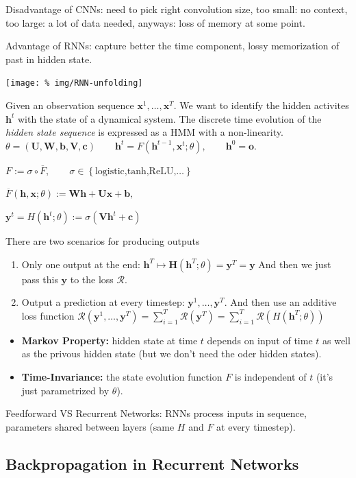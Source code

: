 \documentclass[a2paper,4pt]{extarticle}
\newcommand{\cR}{\mathcal{R}}
\newcommand{\set}[1]{\left\{ #1 \right\}}
\newcommand{\mat}[1]{\mathbf{#1}}
\renewcommand{\vec}[1]{\mathbf{#1}}
\newcommand{\vb}{\vec{b}}
\newcommand{\vc}{\vec{c}}
\newcommand{\vh}{\vec{h}}
\newcommand{\vo}{\vec{o}}
\newcommand{\vx}{\vec{x}}
\newcommand{\vy}{\vec{y}}
\newcommand{\MH}{\mat{H}}
\newcommand{\MU}{\mat{U}}
\newcommand{\MV}{\mat{V}}
\newcommand{\MW}{\mat{W}}
\begin{document}
\begin{landscape}
\begin{multicols*}{7}
Disadvantage of CNNs: need to pick right convolution size, too small: no
context, too large: a lot of data needed, anyways: loss of memory at some point.

Advantage of RNNs: capture better the time component, lossy memorization of
past in hidden state.

\begin{center}
  \texttt{[image: \%
img/RNN-unfolding]}
\end{center}

Given an observation sequence $\vx^1,\ldots,\vx^T$. We want to identify the
hidden activites $\vh^t$ with the state of a dynamical system. The discrete time
evolution of the \emph{hidden state sequence} is expressed as a HMM with a non-linearity.
$
\theta=(\MU,\MW,\vb,\MV,\vc)\qquad
\vh^t=F(\vh^{t-1},\vx^t;\theta),
\qquad
\vh^0=\vo.$

$
F:=\sigma\circ\overline{F},
\qquad
\sigma\in\set{\text{logistic,tanh,ReLU,\ldots}}
$

$
\overline{F}(\vh,\vx;\theta)
:=
\MW\vh+\MU\vx+\vb,
$

$
\vy^t=H(\vh^t;\theta):=\sigma(\MV\vh^t+\vc)
$

There are two scenarios for producing outputs
\begin{enumerate}
  \item Only one output at the end:
  $
  \vh^T\mapsto\MH(\vh^T;\theta)=\vy^T=\vy
  $
  And then we just pass this $\vy$ to the loss $\cR$.
  \item Output a prediction at every timestep: $\vy^1,\ldots,\vy^T$. And then
  use an additive loss function
  $
  \cR(\vy^1,\ldots,\vy^T)=
  \sum_{i=1}^T\cR(\vy^T)=
  \sum_{i=1}^T\cR(H(\vh^T;\theta))
  $
\end{enumerate}
\begin{itemize}
  \item \textbf{Markov Property:} hidden state at time $t$ depends on input of
  time $t$ as well as the privous hidden state (but we don't need the oder
  hidden states).
  \item \textbf{Time-Invariance:} the state evolution function $F$ is
  independent of $t$ (it's just parametrized by $\theta$).
\end{itemize}

Feedforward VS Recurrent Networks: RNNs process inputs in sequence, parameters
shared between layers (same $H$ and $F$ at every timestep).

\subsection{Backpropagation in Recurrent Networks}


\end{multicols*}
\end{landscape}
\end{document}
